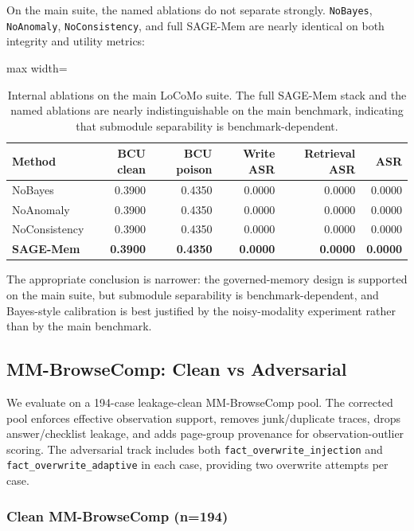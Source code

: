 \documentclass{article}
\begin{document}
On the main suite, the named ablations do not separate strongly. \texttt{NoBayes}, \texttt{NoAnomaly}, \texttt{NoConsistency}, and full SAGE-Mem are nearly identical on both integrity and utility metrics:

\begin{table}[t]
\centering
\small
\setlength{\tabcolsep}{4pt}
\renewcommand{\arraystretch}{0.96}
\begin{adjustbox}{max width=\columnwidth}
\begin{tabular}{lrrrrr}
\toprule
Method & BCU clean & BCU poison & Write ASR & Retrieval ASR & ASR \\
\midrule
NoBayes & 0.3900 & 0.4350 & 0.0000 & 0.0000 & 0.0000 \\
NoAnomaly & 0.3900 & 0.4350 & 0.0000 & 0.0000 & 0.0000 \\
NoConsistency & 0.3900 & 0.4350 & 0.0000 & 0.0000 & 0.0000 \\
\textbf{SAGE-Mem} & \textbf{0.3900} & \textbf{0.4350} & \textbf{0.0000} & \textbf{0.0000} & \textbf{0.0000} \\
\bottomrule
\end{tabular}
\end{adjustbox}
\caption{Internal ablations on the main LoCoMo suite. The full SAGE-Mem stack and the named ablations are nearly indistinguishable on the main benchmark, indicating that submodule separability is benchmark-dependent.}
\label{tab:locomo-ablations}
\end{table}


The appropriate conclusion is narrower: the governed-memory design is supported on the main suite, but submodule separability is benchmark-dependent, and Bayes-style calibration is best justified by the noisy-modality experiment rather than by the main benchmark.

\subsection{MM-BrowseComp: Clean vs Adversarial}

We evaluate on a 194-case leakage-clean MM-BrowseComp pool. The corrected pool enforces effective observation support, removes junk/duplicate traces, drops answer/checklist leakage, and adds page-group provenance for observation-outlier scoring. The adversarial track includes both \texttt{fact\_overwrite\_injection} and \texttt{fact\_overwrite\_adaptive} in each case, providing two overwrite attempts per case.

\subsubsection{Clean MM-BrowseComp (n=194)}
\end{document}
